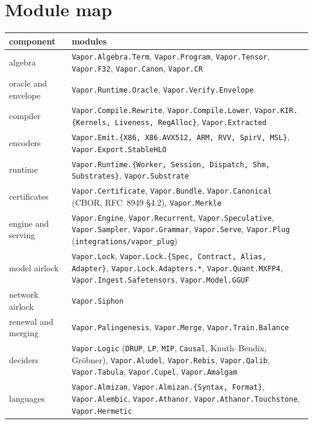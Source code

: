 \chapter{Module map}

\begin{small}
\begin{tabularx}{\textwidth}{@{}lX@{}}
\toprule
component & modules \\
\midrule
algebra & \texttt{Vapor.Algebra.Term}, \texttt{Vapor.Program}, \texttt{Vapor.Tensor}, \texttt{Vapor.F32}, \texttt{Vapor.Canon}, \texttt{Vapor.CR} \\
oracle and envelope & \texttt{Vapor.Runtime.Oracle}, \texttt{Vapor.Verify.Envelope} \\
compiler & \texttt{Vapor.Compile.Rewrite}, \texttt{Vapor.Compile.Lower}, \texttt{Vapor.KIR.\{Kernels, Liveness, RegAlloc\}}, \texttt{Vapor.Extracted} \\
encoders & \texttt{Vapor.Emit.\{X86, X86.AVX512, ARM, RVV, SpirV, MSL\}}, \texttt{Vapor.Export.StableHLO} \\
runtime & \texttt{Vapor.Runtime.\{Worker, Session, Dispatch, Shm, Substrates\}}, \texttt{Vapor.Substrate} \\
certificates & \texttt{Vapor.Certificate}, \texttt{Vapor.Bundle}, \texttt{Vapor.Canonical} (CBOR, RFC~8949 \S4.2), \texttt{Vapor.Merkle} \\
engine and serving & \texttt{Vapor.Engine}, \texttt{Vapor.Recurrent}, \texttt{Vapor.Speculative}, \texttt{Vapor.Sampler}, \texttt{Vapor.Grammar}, \texttt{Vapor.Serve}, \texttt{Vapor.Plug} (\texttt{integrations/vapor\_plug}) \\
model airlock & \texttt{Vapor.Lock}, \texttt{Vapor.Lock.\{Spec, Contract, Alias, Adapter\}}, \texttt{Vapor.Lock.Adapters.*}, \texttt{Vapor.Quant.MXFP4}, \texttt{Vapor.Ingest.Safetensors}, \texttt{Vapor.Model.GGUF} \\
network airlock & \texttt{Vapor.Siphon} \\
renewal and merging & \texttt{Vapor.Palingenesis}, \texttt{Vapor.Merge}, \texttt{Vapor.Train.Balance} \\
deciders & \texttt{Vapor.Logic} (\texttt{DRUP}, \texttt{LP}, \texttt{MIP}, \texttt{Causal}, Knuth--Bendix, Gröbner), \texttt{Vapor.Aludel}, \texttt{Vapor.Rebis}, \texttt{Vapor.Qalib}, \texttt{Vapor.Tabula}, \texttt{Vapor.Cupel}, \texttt{Vapor.Amalgam} \\
languages & \texttt{Vapor.Almizan}, \texttt{Vapor.Almizan.\{Syntax, Format\}}, \texttt{Vapor.Alembic}, \texttt{Vapor.Athanor}, \texttt{Vapor.Athanor.Touchstone}, \texttt{Vapor.Hermetic} \\

\end{tabularx}
\end{small}
